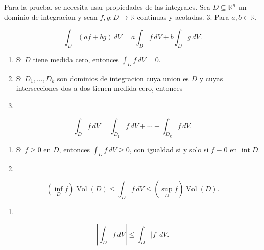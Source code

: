 \begin{bookremark}{}
Para la prueba, se necesita usar propiedades de las integrales. Sea $D\subseteq\mathbb R^n$ un dominio de integracion y sean $f,g:D\to\mathbb R$ continuas y acotadas. 3. Para $a,b\in\mathbb R$,

\[
\int_D(af+bg)\,dV=a\int_Df\,dV+b\int_Dg\,dV.
\]
\begin{enumerate}[start=4]
\item Si $D$ tiene medida cero, entonces $\int_Df\,dV=0$.
\item Si $D_1,\ldots,D_k$ son dominios de integracion cuya union es $D$ y cuyas intersecciones dos a dos tienen medida cero, entonces
\item 
\end{enumerate}
\[
\int_Df\,dV=\int_{D_1}f\,dV+\cdots+\int_{D_k}f\,dV.
\]
\begin{enumerate}[start=7]
\item Si $f\ge0$ en $D$, entonces $\int_Df\,dV\ge0$, con igualdad si y solo si $f\equiv0$ en $\operatorname{int}D$.
\item 
\end{enumerate}
\[
(\inf_Df)\operatorname{Vol}(D)\le\int_Df\,dV\le(\sup_Df)\operatorname{Vol}(D).
\]
\begin{enumerate}[start=9]
\item 
\end{enumerate}
\[
\left|\int_Df\,dV\right|\le\int_D|f|\,dV.
\]
\end{bookremark}
